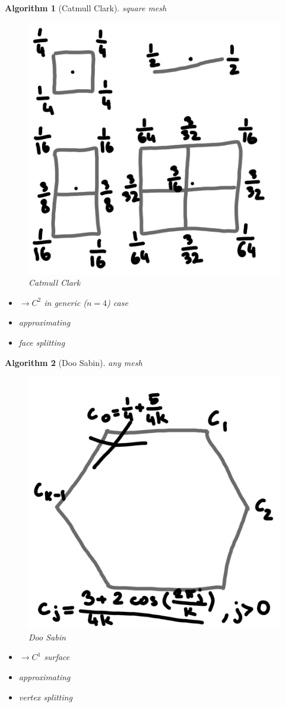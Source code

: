 \documentclass[conference]{IEEEtran}
\newtheorem{algorithm}{Algorithm}
\begin{document}
\begin{algorithm}[Catmull Clark]
	square mesh
	
	\begin{figure}[h!]
		\centering
		\includegraphics[width=0.4\linewidth]{figures/catmull_clark_short}
		\caption{Catmull Clark}
	\end{figure}
	
	\begin{itemize}
		\item $\rightarrow C^2$ in generic ($n=4$) case
		\item approximating
		\item face splitting
	\end{itemize}
\end{algorithm}

\begin{algorithm}[Doo Sabin]
	any mesh
	
	\begin{figure}[h!]
		\centering
		\includegraphics[width=0.4\linewidth]{figures/doo_sabin_short}
		\caption{Doo Sabin}
	\end{figure}
	
	\begin{itemize}
		\item $\rightarrow C^1$ surface
		\item approximating
		\item vertex splitting
	\end{itemize}
\end{algorithm}
\end{document}
